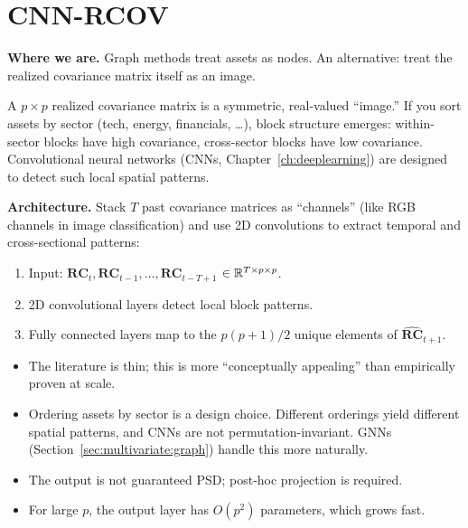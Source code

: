 \section{CNN-RCOV}\label{sec:multivariate:cnn}

\textbf{Where we are.}  Graph methods treat assets as nodes. An alternative:
treat the realized covariance matrix itself as an image.

\begin{keyidea}
A $p \times p$ realized covariance matrix is a symmetric, real-valued ``image.''
If you sort assets by sector (tech, energy, financials, \ldots), block structure
emerges: within-sector blocks have high covariance, cross-sector blocks have
low covariance. Convolutional neural networks (CNNs, Chapter~\ref{ch:deeplearning})
are designed to detect such local spatial patterns.

\textbf{Architecture.}  Stack $T$ past covariance matrices as ``channels''
(like RGB channels in image classification) and use 2D convolutions to
extract temporal and cross-sectional patterns:
\begin{enumerate}[nosep]
  \item Input: $\mathbf{RC}_{t}, \mathbf{RC}_{t-1}, \ldots, \mathbf{RC}_{t-T+1}$
        $\in \mathbb{R}^{T \times p \times p}$.
  \item 2D convolutional layers detect local block patterns.
  \item Fully connected layers map to the $p(p+1)/2$ unique elements of
        $\widehat{\mathbf{RC}}_{t+1}$.
\end{enumerate}
\end{keyidea}

\begin{warning}
\begin{itemize}[nosep]
  \item The literature is thin; this is more ``conceptually appealing'' than
        empirically proven at scale.
  \item Ordering assets by sector is a design choice. Different orderings yield
        different spatial patterns, and CNNs are not permutation-invariant.
        GNNs (Section~\ref{sec:multivariate:graph}) handle this more
        naturally.
  \item The output is not guaranteed PSD; post-hoc projection is required.
  \item For large $p$, the output layer has $O(p^2)$ parameters, which grows
        fast.
\end{itemize}
\end{warning}


